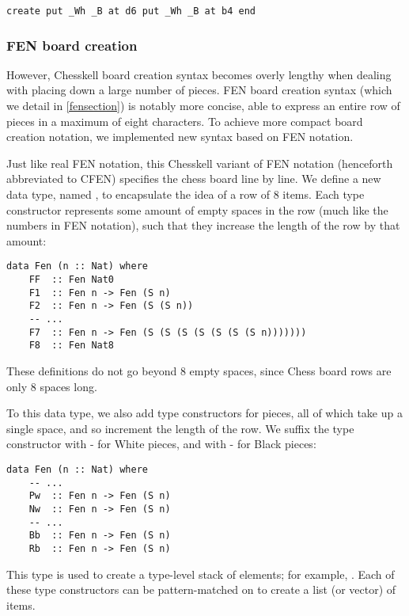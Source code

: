 \begin{lstlisting}
create put _Wh _B at d6 put _Wh _B at b4 end
\end{lstlisting}

\subsubsection{FEN board creation}

However, Chesskell board creation syntax becomes overly lengthy when dealing with placing down a large number of pieces. FEN board creation syntax (which we detail in \cref{fensection}) is notably more concise, able to express an entire row of pieces in a maximum of eight characters. To achieve more compact board creation notation, we implemented new syntax based on FEN notation.

Just like real FEN notation, this Chesskell variant of FEN notation (henceforth abbreviated to CFEN) specifies the chess board line by line. We define a new data type, named , to encapsulate the idea of a row of 8 items. Each type constructor represents some amount of empty spaces in the row (much like the numbers in FEN notation), such that they increase the length of the row by that amount:

\begin{lstlisting}
data Fen (n :: Nat) where
    FF  :: Fen Nat0
    F1  :: Fen n -> Fen (S n)
    F2  :: Fen n -> Fen (S (S n))
    -- ...
    F7  :: Fen n -> Fen (S (S (S (S (S (S (S n)))))))
    F8  :: Fen Nat8
\end{lstlisting}

These definitions do not go beyond 8 empty spaces, since Chess board rows are only 8 spaces long.

To this data type, we also add type constructors for pieces, all of which take up a single space, and so increment the length of the row. We suffix the type constructor with - for White pieces, and with - for Black pieces:

\begin{lstlisting}
data Fen (n :: Nat) where
    -- ...
    Pw  :: Fen n -> Fen (S n)
    Nw  :: Fen n -> Fen (S n)
    -- ...
    Bb  :: Fen n -> Fen (S n)
    Rb  :: Fen n -> Fen (S n)
\end{lstlisting}

This  type is used to create a type-level stack of elements; for example, . Each of these  type constructors can be pattern-matched on to create a list (or vector) of items.

